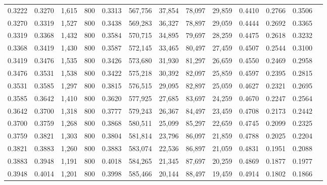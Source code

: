\begin{tabular}{rrrrrrrrrrrrr}
0.3222 & 0.3270 &  1,615 &   800 &                                     0.3313 & 567,756 &  37,854 &  78,097 &  29,859 & 0.4410 & 0.2766 & 0.3506 \\
0.3270 & 0.3319 &  1,527 &   800 &                                     0.3438 & 569,283 &  36,327 &  78,897 &  29,059 & 0.4444 & 0.2692 & 0.3365 \\
0.3319 & 0.3368 &  1,432 &   800 &                                     0.3584 & 570,715 &  34,895 &  79,697 &  28,259 & 0.4475 & 0.2618 & 0.3232 \\
0.3368 & 0.3419 &  1,430 &   800 &                                     0.3587 & 572,145 &  33,465 &  80,497 &  27,459 & 0.4507 & 0.2544 & 0.3100 \\
0.3419 & 0.3476 &  1,535 &   800 &                                     0.3426 & 573,680 &  31,930 &  81,297 &  26,659 & 0.4550 & 0.2469 & 0.2958 \\
0.3476 & 0.3531 &  1,538 &   800 &                                     0.3422 & 575,218 &  30,392 &  82,097 &  25,859 & 0.4597 & 0.2395 & 0.2815 \\
0.3531 & 0.3585 &  1,297 &   800 &                                     0.3815 & 576,515 &  29,095 &  82,897 &  25,059 & 0.4627 & 0.2321 & 0.2695 \\
0.3585 & 0.3642 &  1,410 &   800 &                                     0.3620 & 577,925 &  27,685 &  83,697 &  24,259 & 0.4670 & 0.2247 & 0.2564 \\
0.3642 & 0.3700 &  1,318 &   800 &                                     0.3777 & 579,243 &  26,367 &  84,497 &  23,459 & 0.4708 & 0.2173 & 0.2442 \\
0.3700 & 0.3759 &  1,268 &   800 &                                     0.3868 & 580,511 &  25,099 &  85,297 &  22,659 & 0.4745 & 0.2099 & 0.2325 \\
0.3759 & 0.3821 &  1,303 &   800 &                                     0.3804 & 581,814 &  23,796 &  86,097 &  21,859 & 0.4788 & 0.2025 & 0.2204 \\
0.3821 & 0.3883 &  1,260 &   800 &                                     0.3883 & 583,074 &  22,536 &  86,897 &  21,059 & 0.4831 & 0.1951 & 0.2088 \\
0.3883 & 0.3948 &  1,191 &   800 &                                     0.4018 & 584,265 &  21,345 &  87,697 &  20,259 & 0.4869 & 0.1877 & 0.1977 \\
0.3948 & 0.4014 &  1,201 &   800 &                                     0.3998 & 585,466 &  20,144 &  88,497 &  19,459 & 0.4914 & 0.1802 & 0.1866 \\

\end{tabular}
